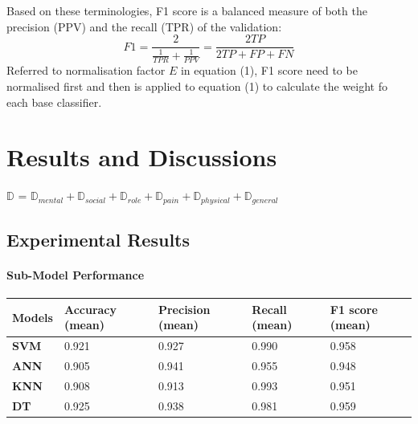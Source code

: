 \documentclass[runningheads]{llncs}
\begin{document}
Based on these terminologies, F1 score is a balanced measure of both the precision (PPV) and the recall (TPR) of the validation: 
\begin{equation}\label{reio}
	F1 = \frac{2 }{\frac{1}{TPR} + \frac{1}{PPV}} = \frac{2TP}{2TP + FP + FN}
\end{equation}
Referred to normalisation factor $E$ in equation (1), F1 score need to be normalised first and then is applied to equation (1) to calculate the weight fo each base classifier. 
%
%
%
%
%
%
%
\pagebreak
\section{Results and Discussions}
%
$\mathbb{D}$ = $\mathbb{D}_{mental} + \mathbb{D}_{social} + \mathbb{D}_{role} + \mathbb{D}_{pain} + \mathbb{D}_{physical} + \mathbb{D}_{general}$
%
\subsection{Experimental Results}
%
%
%
\paragraph{Sub-Model Performance}
%
\begin{center}
\begin{table}[h]
\begin{tabular}{|C{2cm}|C{2cm}|C{2cm}|C{2cm}|C{2cm}|}
\hline
{} 
{\color[HTML]{333333} \textbf{Models}} & {\color[HTML]{333333} \textbf{Accuracy (mean)}} & {\color[HTML]{333333} \textbf{Precision (mean)}} & {\color[HTML]{333333} \textbf{Recall (mean)}} & {\color[HTML]{333333} \textbf{F1 score (mean)}} \\ \hline
{} 
\textbf{SVM}                                    & 0.921                                    & 0.927                                     & 0.990                                  & 0.958                                    \\ \hline
{} 
\textbf{ANN}                                    & 0.905                                    & 0.941                                     & 0.955                                  & 0.948                                    \\ \hline
{} 
\textbf{KNN}                                    & 0.908                                    & 0.913                                     & 0.993                                  & 0.951                                    \\ \hline
{} 
\textbf{DT}                                     & 0.925                                    & 0.938                                     & 0.981                                  & 0.959                                    \\ \hline
\end{tabular}
\end{table}
\end{center}
%
%
\end{document}
